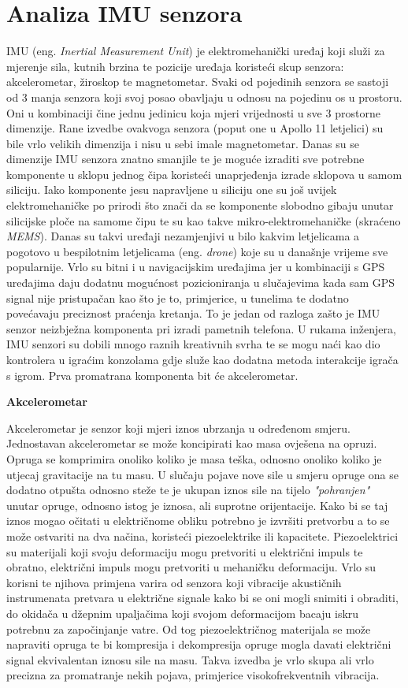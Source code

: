 \documentclass[times, utf8, diplomski]{fer}
\begin{document}
\chapter{Analiza IMU senzora}
IMU (eng. \textit{Inertial Measurement Unit}) je elektromehanički uređaj koji služi za mjerenje sila, kutnih brzina te pozicije
uređaja koristeći skup senzora: akcelerometar, žiroskop te magnetometar. Svaki od pojedinih senzora se sastoji od 3 manja senzora
koji svoj posao obavljaju u odnosu na pojedinu os u prostoru. Oni u kombinaciji čine jednu jedinicu koja mjeri vrijednosti u sve 
3 prostorne dimenzije. Rane izvedbe ovakvoga senzora (poput one u Apollo 11 letjelici) su bile vrlo velikih dimenzija i nisu
u sebi imale magnetometar. Danas su se dimenzije IMU senzora znatno smanjile te je moguće izraditi sve potrebne komponente u
sklopu jednog čipa koristeći unaprjeđenja izrade sklopova u samom siliciju. Iako komponente jesu napravljene u siliciju one su
još uvijek elektromehaničke po prirodi što znači da se komponente slobodno gibaju unutar silicijske ploče na samome čipu
te su kao takve mikro-elektromehaničke (skraćeno \textit{MEMS}). Danas su takvi uređaji nezamjenjivi u bilo kakvim letjelicama a
pogotovo u bespilotnim letjelicama (eng. \textit{drone}) koje su u današnje vrijeme sve popularnije. Vrlo su bitni i u
navigacijskim uređajima jer u kombinaciji s GPS uređajima daju dodatnu mogućnost pozicioniranja u slučajevima kada sam GPS signal
nije pristupačan kao što je to, primjerice, u tunelima te dodatno povećavaju preciznost praćenja kretanja. To je jedan od razloga
zašto je IMU senzor neizbježna komponenta pri izradi pametnih telefona. U rukama inženjera, IMU senzori su dobili mnogo raznih 
kreativnih svrha te se mogu naći kao dio kontrolera u igraćim konzolama gdje služe kao dodatna metoda interakcije igrača s igrom.
Prva promatrana komponenta bit će akcelerometar.

\textbf{Akcelerometar}

Akcelerometar je senzor koji mjeri iznos ubrzanja u određenom smjeru. Jednostavan akcelerometar se može koncipirati kao masa ovješena na 
opruzi. Opruga se komprimira onoliko koliko je masa teška, odnosno onoliko koliko je utjecaj gravitacije na tu masu. U slučaju
pojave nove sile u smjeru opruge ona se dodatno otpušta odnosno steže te je ukupan iznos sile na tijelo \textit{"pohranjen"}
unutar opruge, odnosno istog je iznosa, ali suprotne orijentacije. Kako bi se taj iznos mogao očitati u električnome obliku potrebno
je izvršiti pretvorbu a to se može ostvariti na dva načina, koristeći piezoelektrike ili kapacitete. Piezoelektrici
su materijali koji svoju deformaciju mogu pretvoriti u električni impuls te obratno, električni impuls mogu pretvoriti u mehaničku
deformaciju. Vrlo su korisni te njihova primjena varira od senzora koji vibracije akustičnih instrumenata pretvara u električne
signale kako bi se oni mogli snimiti i obraditi, do okidača u džepnim upaljačima koji svojom deformacijom bacaju iskru potrebnu za
započinjanje vatre. Od tog piezoelektričnog materijala se može napraviti opruga te bi kompresija i dekompresija opruge mogla davati
električni signal ekvivalentan iznosu sile na masu. Takva izvedba je vrlo skupa ali vrlo precizna za promatranje nekih pojava,
primjerice visokofrekventnih vibracija.
\end{document}
